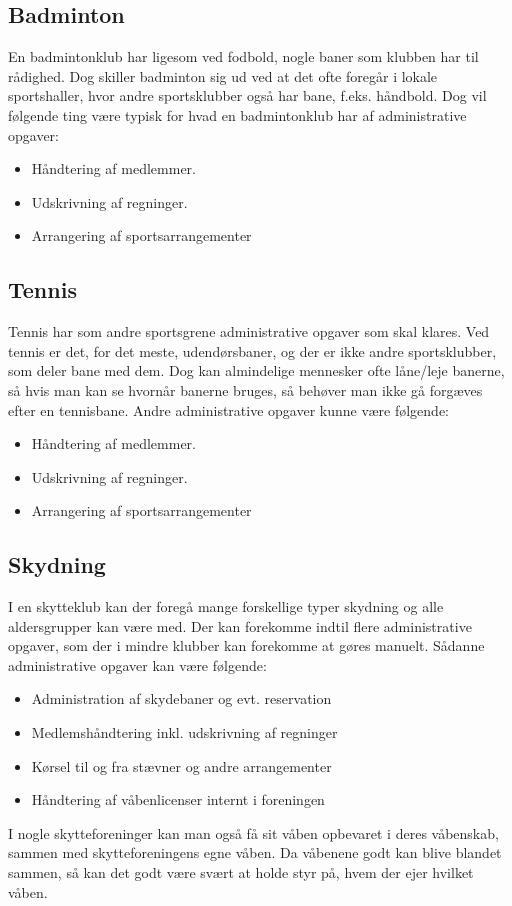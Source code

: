 \subsection{Badminton}
En badmintonklub har ligesom ved fodbold, nogle baner som klubben har til rådighed. Dog skiller badminton sig ud ved at det ofte foregår i lokale sportshaller, hvor andre sportsklubber også har bane, f.eks. håndbold. Dog vil følgende ting være typisk for hvad en badmintonklub har af administrative opgaver:
\begin{itemize}
\item Håndtering af medlemmer.
\item Udskrivning af regninger.
\item Arrangering af sportsarrangementer
\end{itemize}

\subsection{Tennis}
Tennis har som andre sportsgrene administrative opgaver som skal klares. Ved tennis er det, for det meste, udendørsbaner, og der er ikke andre sportsklubber, som deler bane med dem. Dog kan almindelige mennesker ofte låne/leje banerne, så hvis man kan se hvornår banerne bruges, så behøver man ikke gå forgæves efter en tennisbane.
Andre administrative opgaver kunne være følgende:
\begin{itemize}
\item Håndtering af medlemmer.
\item Udskrivning af regninger.
\item Arrangering af sportsarrangementer
\end{itemize}

\subsection{Skydning}
I en skytteklub kan der foregå mange forskellige typer skydning og alle aldersgrupper kan være med. Der kan forekomme indtil flere administrative opgaver, som der i mindre klubber kan forekomme at gøres manuelt. Sådanne administrative opgaver kan være følgende:
\begin{itemize}
\item Administration af skydebaner og evt. reservation
\item Medlemshåndtering inkl. udskrivning af regninger
\item Kørsel til og fra stævner og andre arrangementer
\item Håndtering af våbenlicenser internt i foreningen
\end{itemize}
I nogle skytteforeninger kan man også få sit våben opbevaret i deres våbenskab, sammen med skytteforeningens egne våben. Da våbenene godt kan blive blandet sammen, så kan det godt være svært at holde styr på, hvem der ejer hvilket våben.

